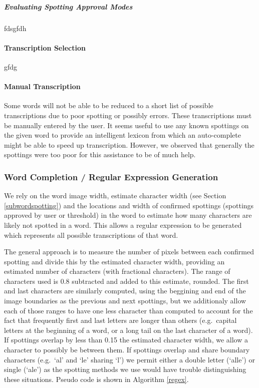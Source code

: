 \documentclass[ms,electronic,twosidetoc,letterpaper,chaptercenter,parttop,lol,lof,lot]{byumsphd}
\begin{document}
\subparagraph{Evaluating Spotting Approval Modes}

fdsgfdh
\fi

\paragraph{Transcription Selection}
gfdg

\paragraph{Manual Transcription}
Some words will not be able to be reduced to a short list of possible transcriptions due to poor spotting or possibly errors. These transcriptions must be manually entered by the user. It seems useful to use any known spottings on the given word to provide an intelligent lexicon from which an auto-complete might be able to speed up transcription. However, we observed that generally the spottings were too poor for this assistance to be of much help.


\subsubsection{Word Completion / Regular Expression Generation}
We rely on the word image width, estimate character width (see Section \ref{subwordspotting}) and the locations and width of confirmed spottings (spottings approved by user or threshold) in the word to estimate how many characters are likely not spotted in a word. This allows a regular expression to be generated which represents all possible transcriptions of that word.



The general approach is to measure the number of pixels between each confirmed spotting and divide this by the estimated character width, providing an estimated number of characters (with fractional characters). The range of characters used is 0.8 subtracted and added to this estimate, rounded. The first and last characters are similarly computed, using the beggining and end of the image boundaries as the previous and next spottings, but we additionaly allow each of those ranges to have one less character than computed to account for the fact that frequently first and last letters are longer than others (e.g.~capital letters at the beginning of a word, or a long tail on the last character of a word). If spottings overlap by less than 0.15 the estimated character width, we allow a character to possibly be between them. If spottings overlap and share boundary characters (e.g.~`al' and `le' sharing `l') we permit either a double letter (`alle') or single (`ale') as the spotting methods we use would have trouble distinguishing these situations. Pseudo code is shown in Algorithm \ref{regex}.
\end{document}
